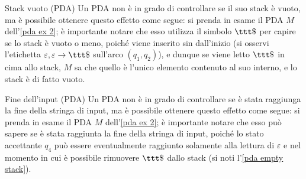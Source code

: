 \documentclass[a4paper, 12pt]{report}
\begin{document}
    \begin{framedobs}[label={pda empty stack}]{Stack vuoto (PDA)}
        Un PDA non è in grado di controllare se il suo stack è vuoto, ma è possibile ottenere questo effetto come segue: si prenda in esame il PDA $M$ dell'\cref{pda ex 2}; è importante notare che esso utilizza il simbolo $\ttt \$$ per capire se lo stack è vuoto o meno, poiché viene inserito sin dall'inizio (si osservi l'etichetta $\varepsilon, \varepsilon \to \ttt \$$ sull'arco $(q_1, q_2)$), e dunque se viene letto $\ttt \$$ in cima allo stack, $M$ sa che quello è l'unico elemento contenuto al suo interno, e lo stack è di fatto vuoto.
    \end{framedobs}

    \begin{framedobs}{Fine dell'input (PDA)}
        Un PDA non è in grado di controllare se è stata raggiunga la fine della stringa di input, ma è possibile ottenere questo effetto come segue: si prenda in esame il PDA $M$ dell'\cref{pda ex 2}; è importante notare che esso può sapere se è stata raggiunta la fine della stringa di input, poiché lo stato accettante $q_4$ può essere eventualmente raggiunto solamente alla lettura di $\varepsilon$ e nel momento in cui è possibile rimuovere $\ttt \$$ dallo stack (si noti l'\cref{pda empty stack}).
    \end{framedobs}
\end{document}
